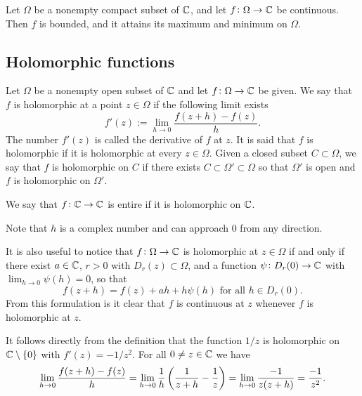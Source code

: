 \documentclass[11pt,a4paper]{article}
\begin{document}
\begin{proposition}
  Let $\Omega$ be a nonempty compact subset of $\mathbb{C}$, and let 
  $f \colon \Omega \to \mathbb{C}$ be continuous.
  Then $f$ is bounded, and it attains its maximum and minimum on $\Omega$.
\end{proposition}

\subsection{Holomorphic functions}

\begin{definition}
  Let $\Omega$ be a nonempty open subset of $\mathbb{C}$ and let 
  $f \colon \Omega \to \mathbb{C}$ be given.
  We say that $f$ is holomorphic at a point $z \in \Omega$
  if the following limit exists
  \[
      f'(z) := \lim_{h \to 0} \frac{f(z + h) - f(z)}{h}.
  \]
  The number $f'(z)$ is called the derivative of $f$ at $z$.
  It is said that $f$ is holomorphic if it is holomorphic at every
  $z \in \Omega$.
  Given a closed subset $C \subset \Omega$, we say that $f$ is holomorphic
  on $C$ if there exists $C \subset \Omega' \subset \Omega$ so that
  $\Omega'$ is open and $f$ is holomorphic on $\Omega'$.
\end{definition}

\begin{definition}
  We say that $f \colon \mathbb{C} \to \mathbb{C}$ is entire if it is holomorphic on $\mathbb{C}$.
\end{definition}

\begin{remark}
  Note that $h$ is a complex number and can approach $0$ from any direction.
\end{remark}

\begin{remark}
  It is also useful to notice that $f \colon \Omega \to \mathbb{C}$ is holomorphic
  at $z \in \Omega$ if and only if there exist $a \in \mathbb{C}$, $r > 0$ with
  $D_r(z) \subset \Omega$, and a function $\psi \colon D_r(0) \to \mathbb{C}$ with
  $\lim_{h \to 0} \psi(h) = 0$, so that
  \[
    f(z + h) = f(z) + ah + h \psi(h) \text{ for all } h \in D_r(0).
  \]
  From this formulation is it clear that $f$ is continuous at $z$ whenever
  $f$ is holomorphic at $z$.
\end{remark}

\begin{example}
  It follows directly from the definition that the function $1/z$ is holomorphic
  on $\mathbb{C} \setminus \set{0}$ with $f'(z) = -1/z^2$. For all $0 \neq z \in \mathbb{C}$
  we have
  \[
    \lim_{h \to 0} \frac{f(z + h) - f(z)}{h} =
    \lim_{h \to 0} \frac{1}{h} \del{\frac{1}{z + h} - \frac{1}{z}} =
    \lim_{h \to 0} \frac{-1}{z (z + h)} =
    \frac{-1}{z^2}.
  \]
\end{example}
\end{document}
